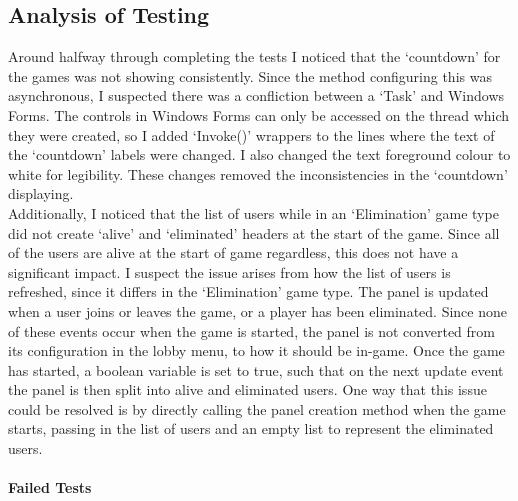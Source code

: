 \documentclass{article}
\begin{document}
\subsection{Analysis of Testing}

Around halfway through completing the tests I noticed that the `countdown' for the games was not showing consistently. Since the method configuring this was asynchronous, I suspected there was a confliction between a `Task' and Windows Forms. The controls in Windows Forms can only be accessed on the thread which they were created, so I added `Invoke()' wrappers to the lines where the text of the `countdown' labels were changed. I also changed the text foreground colour to white for legibility. These changes removed the inconsistencies in the `countdown' displaying. \\

Additionally, I noticed that the list of users while in an `Elimination' game type did not create `alive' and `eliminated' headers at the start of the game. Since all of the users are alive at the start of game regardless, this does not have a significant impact. I suspect the issue arises from how the list of users is refreshed, since it differs in the `Elimination' game type. The panel is updated when a user joins or leaves the game, or a player has been eliminated. Since none of these events occur when the game is started, the panel is not converted from its configuration in the lobby menu, to how it should be in-game. Once the game has started, a boolean variable is set to true, such that on the next update event the panel is then split into alive and eliminated users. One way that this issue could be resolved is by directly calling the panel creation method when the game starts, passing in the list of users and an empty list to represent the eliminated users. \\

\paragraph{Failed Tests\\}
\end{document}
